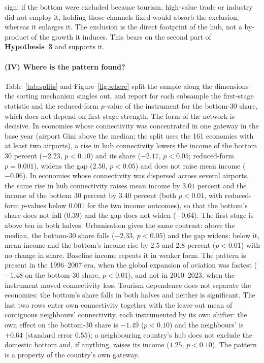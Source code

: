 sign: if the bottom were excluded because tourism, high-value trade or industry did not employ it, holding those channels fixed would absorb the exclusion, whereas it enlarges it. The exclusion is the direct footprint of the hub, not a by-product of the growth it induces. This bears on the second part of \textbf{Hypothesis~3} and supports it.



\paragraph{(IV) Where is the pattern found?}
Table~\ref{tab:splits} and Figure~\ref{fig:where} split the sample along the dimensions the sorting mechanism singles out, and report for each subsample the first-stage statistic and the reduced-form $p$-value of the instrument for the bottom-30 share, which does not depend on first-stage strength. The form of the network is decisive. In economies whose connectivity was concentrated in one gateway in the base year (airport Gini above the median; the split uses the 161 economies with at least two airports), a rise in hub connectivity lowers the income of the bottom 30 percent ($-2.23$, $p<0.10$) and its share ($-2.17$, $p<0.05$; reduced-form $p=0.001$), widens the gap ($2.50$, $p<0.05$) and does not raise mean income ($-0.06$). In economies whose connectivity was dispersed across several airports, the same rise in hub connectivity raises mean income by $3.01$ percent and the income of the bottom 30 percent by $3.40$ percent (both $p<0.01$, with reduced-form $p$-values below 0.001 for the two income outcomes), so that the bottom's share does not fall ($0.39$) and the gap does not widen ($-0.64$). The first stage is above ten in both halves. Urbanisation gives the same contrast: above the median, the bottom-30 share falls ($-2.33$, $p<0.05$) and the gap widens; below it, mean income and the bottom's income rise by $2.5$ and $2.8$ percent ($p<0.01$) with no change in share. Baseline income repeats it in weaker form. The pattern is present in the 1996--2007 era, when the global expansion of aviation was fastest ($-1.48$ on the bottom-30 share, $p<0.01$), and not in 2010--2023, when the instrument moved connectivity less. Tourism dependence does not separate the economies: the bottom's share falls in both halves and neither is significant. The last two rows enter own connectivity together with the leave-out mean of contiguous neighbours' connectivity, each instrumented by its own shifter: the own effect on the bottom-30 share is $-1.49$ ($p<0.10$) and the neighbours' is $+0.64$ (standard error $0.55$); a neighbouring country's hub does not exclude the domestic bottom and, if anything, raises its income ($1.25$, $p<0.10$). The pattern is a property of the country's own gateway.

